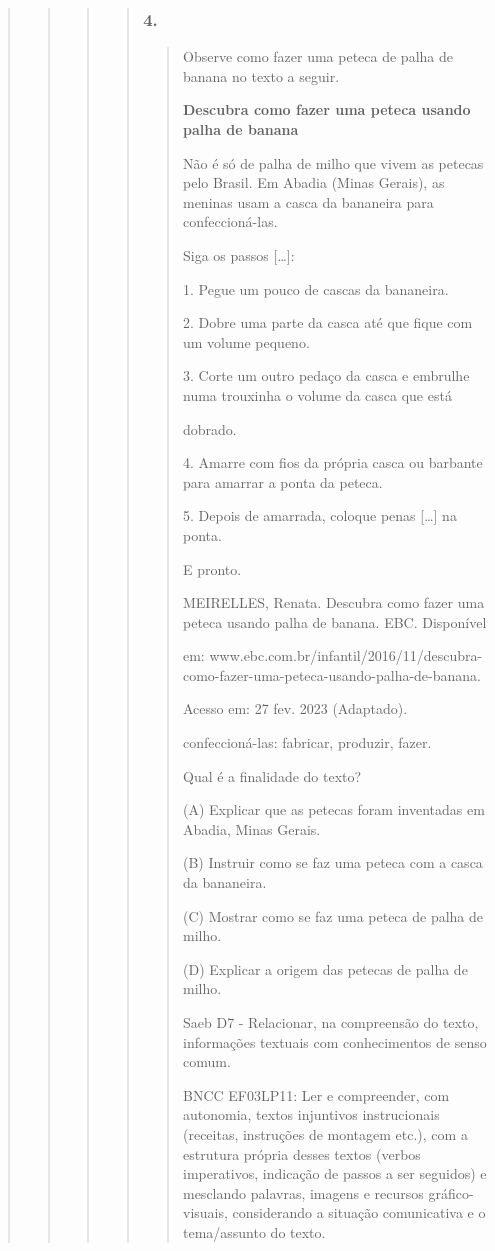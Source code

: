 \begin{quote}
\begin{quote}
\begin{quote}
\begin{quote}
\subsubsection{4. }\label{section-87}

\begin{quote}
Observe como fazer uma peteca de palha de banana no texto a seguir.

\textbf{Descubra como fazer uma peteca usando palha de banana}

Não é só de palha de milho que vivem as petecas pelo Brasil. Em Abadia
(Minas Gerais), as meninas usam a casca da bananeira para
confeccioná-las.

Siga os passos {[}\ldots{}{]}:

1. Pegue um pouco de cascas da bananeira.

2. Dobre uma parte da casca até que fique com um volume pequeno.

3. Corte um outro pedaço da casca e embrulhe numa trouxinha o volume da
casca que está

dobrado.

4. Amarre com fios da própria casca ou barbante para amarrar a ponta da
peteca.

5. Depois de amarrada, coloque penas {[}\ldots{}{]} na ponta.

E pronto.

MEIRELLES, Renata. Descubra como fazer uma peteca usando palha de
banana. EBC. Disponível

em:
www.ebc.com.br/infantil/2016/11/descubra-como-fazer-uma-peteca-usando-palha-de-banana.

Acesso em: 27 fev. 2023 (Adaptado).

confeccioná-las: fabricar, produzir, fazer.

Qual é a finalidade do texto?

(A) Explicar que as petecas foram inventadas em Abadia, Minas Gerais.

(B) Instruir como se faz uma peteca com a casca da bananeira.

(C) Mostrar como se faz uma peteca de palha de milho.

(D) Explicar a origem das petecas de palha de milho.

Saeb D7 - Relacionar, na compreensão do texto, informações textuais com
conhecimentos de senso comum.

BNCC EF03LP11: Ler e compreender, com autonomia, textos injuntivos
instrucionais (receitas, instruções de montagem etc.), com a estrutura
própria desses textos (verbos imperativos, indicação de passos a ser
seguidos) e mesclando palavras, imagens e recursos gráfico- visuais,
considerando a situação comunicativa e o tema/assunto do texto.


\end{quote}
\end{quote}
\end{quote}
\end{quote}
\end{quote}

